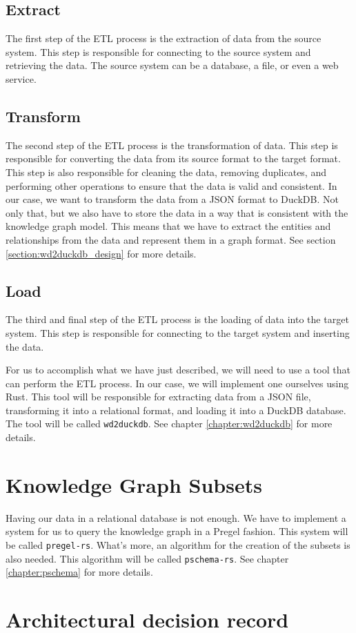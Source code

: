 \subsection{Extract}

The first step of the ETL process is the extraction of data from the source system. This step is responsible for connecting to the source system and retrieving the data. The source system can be a database, a file, or even a web service.

\subsection{Transform}

The second step of the ETL process is the transformation of data. This step is responsible for converting the data from its source format to the target format. This step is also responsible for cleaning the data, removing duplicates, and performing other operations to ensure that the data is valid and consistent. In our case, we want to transform the data from a JSON format to DuckDB. Not only that, but we also have to store the data in a way that is consistent with the knowledge graph model. This means that we have to extract the entities and relationships from the data and represent them in a graph format. See section \ref{section:wd2duckdb_design} for more details.

\subsection{Load}

The third and final step of the ETL process is the loading of data into the target system. This step is responsible for connecting to the target system and inserting the data.

For us to accomplish what we have just described, we will need to use a tool that can perform the ETL process. In our case, we will implement one ourselves using Rust. This tool will be responsible for extracting data from a JSON file, transforming it into a relational format, and loading it into a DuckDB database. The tool will be called \texttt{wd2duckdb}. See chapter \ref{chapter:wd2duckdb} for more details.

\section{Knowledge Graph Subsets}

Having our data in a relational database is not enough. We have to implement a system for us to query the knowledge graph in a Pregel fashion. This system will be called \texttt{pregel-rs}. What's more, an algorithm for the creation of the subsets is also needed. This algorithm will be called \texttt{pschema-rs}. See chapter \ref{chapter:pschema} for more details.

\section{Architectural decision record}